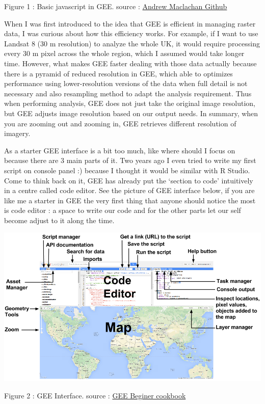 \documentclass[
  letterpaper,
  DIV=11,
  numbers=noendperiod]{scrreprt}
\begin{document}
Figure 1 : Basic javascript in GEE. source :
\href{https://andrewmaclachlan.github.io/CASA0023/5_GEE_I.html}{Andrew
Maclachan Github}

When I was first introduced to the idea that GEE is efficient in
managing raster data, I was curious about how this efficiency works. For
example, if I want to use Landsat 8 (30 m resolution) to analyze the
whole UK, it would require processing every 30 m pixel across the whole
region, which I assumed would take longer time. However, what makes GEE
faster dealing with those data actually because there is a pyramid of
reduced resolution in GEE, which able to optimizes performance using
lower-resolution versions of the data when full detail is not necessary
and also resampling method to adapt the analysis requirement. Thus when
performing analysis, GEE does not just take the original image
resolution, but GEE adjusts image resolution based on our output needs.
In summary, when you are zooming out and zooming in, GEE retrieves
different resolution of imagery.

As a starter GEE interface is a bit too much, like where should I focus
on because there are 3 main parts of it. Two years ago I even tried to
write my first script on console panel :) because I thought it would be
similar with R Studio. Come to think back on it, GEE has already put the
`section to code' intuitively in a centre called code editor. See the
picture of GEE interface below, if you are like me a starter in GEE the
very first thing that anyone should notice the most is code editor : a
space to write our code and for the other parts let our self become
adjust to it along the time.

\includegraphics[width=7.17708in,height=\textheight]{images/ee-editor_1920.png}

Figure 2 : GEE Interface. source :
\href{https://developers.google.com/earth-engine/tutorials/community/beginners-cookbook}{GEE
Beginer cookbook}
\end{document}
